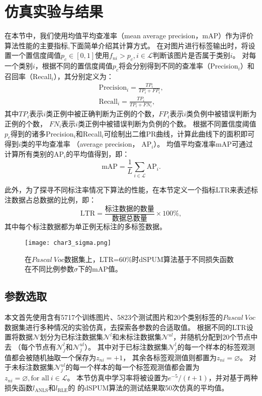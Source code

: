 \section{仿真实验与结果}\label{Char3_Experiments}
在本节中，我们使用均值平均查准率（mean average precision，mAP）作为评价算法性能的主要指标,下面简单介绍其计算方式。
在对图片进行标签输出时，将设置一个置信度阈值$p_c\in\left[0,1\right]$使用$f_{ni} > p_c,i\in\mathcal{L}$判断该图片是否属于类别$i$。
对每一个类别$i$，根据不同的置信度阈值$p_c$将会分别得到不同的查准率（Precision$_i$）和召回率（Recall$_i$），其分别定义为：
\begin{equation}
    \label{PandR}
    \begin{split}
        \text{Precision}_i = \frac{TP_i}{TP_i+FP_i}, \\
        \text{Recall}_i = \frac{TP_i}{TP_i+FN_i},
    \end{split}
\end{equation}
其中$TP_i$表示$i$类正例中被正确判断为正例的个数，$FP_i$表示$i$类负例中被错误判断为正例的个数，
$FN_i$表示$i$类正例中被错误判断为负例的个数。
根据不同置信度阈值$p_c$得到的诸多Precision$_i$和Recall$_i$可绘制出二维PR曲线，计算此曲线下的面积即可得到$i$类的平均查准率
（average precision， AP$_i$）。
均值平均查准率mAP可通过计算所有类别的AP$_i$的平均值得到，即：
\begin{equation}
    \label{mAP}
    \text{mAP}=\frac{1}{L}\sum_{i\in\mathcal{L}}\text{AP}_i.
\end{equation}

{此外，为了探寻不同标注率情况下算法的性能，在本节定义一个指标LTR来表述标注数据占总数据的比例，即：}
\begin{equation}
    \label{LTR}
    \mathrm{LTR}=\frac{\text{标注数据的数量}}{\text{数据总数量}}\times100\%,
\end{equation}
其中每个标注数据都为单正例无标注的多标签数据。

\begin{figure}[htbp]
    \centering
    \texttt{[image: char3\_sigma.png]}
    \caption{\label{fig3:sigma}在$Pascal~Voc$数据集上，LTR=60\%时dSPUM算法基于不同损失函数在不同比例参数$\sigma$下的mAP值。}
\end{figure}

\subsection{参数选取}
本文首先使用含有5717个训练图片、5823个测试图片和20个类别标签的$Pascal~Voc$数据集进行多种情况的实验仿真，去探索各参数的合适取值。
根据不同的LTR设置将数据$\mathcal{N}$划分为已标注数据集$\mathcal{N}^{l}$和未标注数据集$\mathcal{N}^{ul}$，并随机分配到20个节点中去
（每个节点有$\mathcal{N}_j^{l}$和$\mathcal{N}_j^{ul}$）。
其中对于已标注数据集$\mathcal{N}_j^{l}$的每一个样本的标签观测值都会被随机抽取一个保存为$z_{ni}=+1$，
其余各标签观测值则都置为$z_{ni}=\varnothing$。
对于未标注数据集$\mathcal{N}_j^{ul}$的每一个样本的每一个标签观测值都会置为
$z_{ni}=\varnothing, \text{for all}~i\in\mathcal{L}$。
本节仿真中学习率将被设置为${e^{-5}}/\left(t+1\right)$，并对基于两种损失函数$l_{\mathrm{ANLS}}$和$l_{\mathrm{RLE}}$的
的dSPUM算法的测试结果取50次仿真的平均值。

